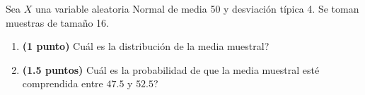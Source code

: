
Sea $X$ una variable aleatoria Normal de media 50 y desviación típica 4. Se toman muestras de tamaño 16.
\begin{enumerate}[label=\alph*)]
\item \textbf{(1 punto)} \textquestiondown{}Cuál es la distribución de la media muestral?
\item \textbf{(1.5 puntos)} \textquestiondown{}Cuál es la probabilidad de que la media muestral esté comprendida entre $47.5$ y $52.5$?
\end{enumerate}
